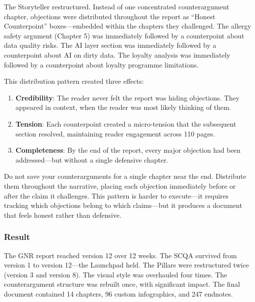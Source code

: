 The Storyteller restructured. Instead of one concentrated counterargument chapter, objections were distributed throughout the report as ``Honest Counterpoint'' boxes---embedded within the chapters they challenged. The allergy safety argument (Chapter 5) was immediately followed by a counterpoint about data quality risks. The AI layer section was immediately followed by a counterpoint about AI on dirty data. The loyalty analysis was immediately followed by a counterpoint about loyalty programme limitations.

This distribution pattern created three effects:
\begin{enumerate}
  \item \textbf{Credibility}: The reader never felt the report was hiding objections. They appeared in context, when the reader was most likely thinking of them.
  \item \textbf{Tension}: Each counterpoint created a micro-tension that the subsequent section resolved, maintaining reader engagement across 110 pages.
  \item \textbf{Completeness}: By the end of the report, every major objection had been addressed---but without a single defensive chapter.
\end{enumerate}

\begin{insightbox}
Do not save your counterarguments for a single chapter near the end. Distribute them throughout the narrative, placing each objection immediately before or after the claim it challenges. This pattern is harder to execute---it requires tracking which objections belong to which claims---but it produces a document that feels honest rather than defensive.
\end{insightbox}

\subsubsection{Result}

The GNR report reached version 12 over 12 weeks. The SCQA survived from version 1 to version 12---the Launchpad held. The Pillars were restructured twice (version 3 and version 8). The visual style was overhauled four times. The counterargument structure was rebuilt once, with significant impact. The final document contained 14 chapters, 96 custom infographics, and 247 endnotes.


